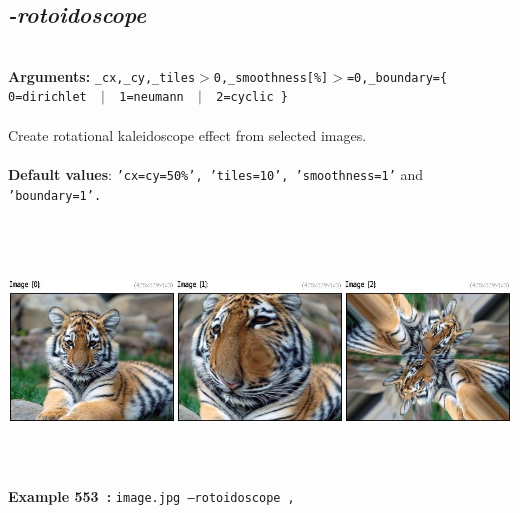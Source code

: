 \documentclass[a4paper,11pt,twoside]{book}
\begin{document}
\subsection{\emph{-rotoidoscope} }\vspace*{-0.5em}
~\\\textbf{Arguments: } 
{\small \texttt{\_cx,\_cy,\_tiles$>$0,\_smoothness[\%]$>$=0,\_boundary=\{ 0=dirichlet ~$|$~ 1=neumann ~$|$~ 2=cyclic \}}}\\~\\
Create rotational kaleidoscope effect from selected images.
~\\~\\\textbf{Default values}: {\small \texttt{'cx=cy=50\%', 'tiles=10', 'smoothness=1'} and \texttt{'boundary=1'.}}
\begin{center}\includegraphics[keepaspectratio=true,height=7cm,width=\textwidth]{img/gmic_def553.jpg}\\
{\footnotesize \textbf{Example 553~:} \texttt{image.jpg --rotoidoscope ,}}
\end{center}
\end{document}
